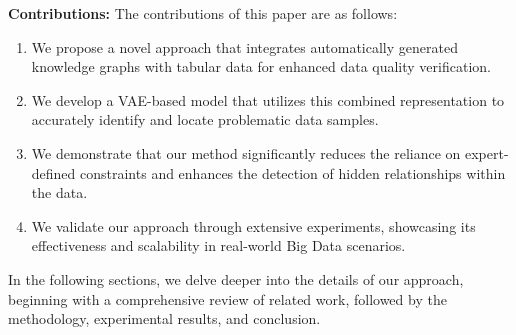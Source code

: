 \noindent\textbf{Contributions:} The contributions of this paper are as follows:
\begin{enumerate}[leftmargin=*]
    \item We propose a novel approach that integrates automatically generated knowledge graphs with tabular data for enhanced data quality verification.
    \item We develop a VAE-based model that utilizes this combined representation to accurately identify and locate problematic data samples.
    \item We demonstrate that our method significantly reduces the reliance on expert-defined constraints and enhances the detection of hidden relationships within the data.
    \item We validate our approach through extensive experiments, showcasing its effectiveness and scalability in real-world Big Data scenarios.
\end{enumerate}

In the following sections, we delve deeper into the details of our approach, beginning with a comprehensive review of related work, followed by the methodology, experimental results, and conclusion.

